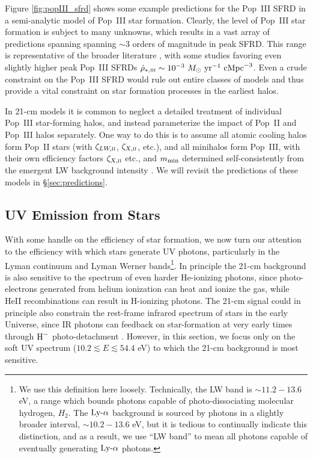 Figure \ref{fig:popIII_sfrd} shows some example predictions for the Pop~III SFRD in a semi-analytic model of Pop~III star formation. Clearly, the level of Pop~III star formation is subject to many unknowns, which results in a vast array of predictions spanning spanning $\sim 3$ orders of magnitude in peak SFRD. This range is representative of the broader literature \cite{Trenti2009,Maio2010,Crosby2013,Visbal2018,Mebane2018,Jaacks2018,Sarmento2018}, with some studies favoring even slightly higher peak Pop~III SFRDs $\dot{\rho}_{\ast,\textsc{iii}} \sim 10^{-3} \ \sfrdunits$. Even a crude constraint on the Pop~III SFRD would rule out entire classes of models and thus provide a vital constraint on star formation processes in the earliest halos.

In 21-cm models it is common to neglect a detailed treatment of individual Pop~III star-forming halos, and instead parameterize the impact of Pop~II and Pop~III halos separately. One way to do this is to assume all atomic cooling halos form Pop~II stars (with $\zeta_{LW,\textsc{ii}}$, $\zeta_{X,\textsc{ii}}$, etc.), and all minihalos form Pop~III, with their own efficiency factors $\zeta_{X,\textsc{ii}}$ etc., and $m_{\text{min}}$ determined self-consistently from the emergent LW background intensity \cite{Fialkov2014a,Mirocha2018}. We will revisit the predictions of these models in \S\ref{sec:predictions}.

\subsection{UV Emission from Stars} \label{sec:UV}
With some handle on the efficiency of star formation, we now turn our attention to the efficiency with which stars generate UV photons, particularly in the Lyman continuum and Lyman Werner bands\footnote{We use this definition here loosely. Technically, the LW band is $\sim 11.2-13.6$ eV, a range which bounds photons capable of photo-dissociating molecular hydrogen, $H_2$. The $\text{Ly-}\alpha$ background is sourced by photons in a slightly broader interval, $\sim 10.2-13.6$ eV, but it is tedious to continually indicate this distinction, and as a result, we use ``LW band'' to mean all photons capable of eventually generating $\text{Ly-}\alpha$ photons.}. In principle the 21-cm background is also sensitive to the spectrum of even harder He-ionizing photons, since photo-electrons generated from helium ionization can heat and ionize the gas, while HeII recombinations can result in H-ionizing photons. The 21-cm signal could in principle also constrain the rest-frame infrared spectrum of stars in the early Universe, since IR photons can feedback on star-formation at very early times through $\text{H}^{-}$ photo-detachment \cite{WolcottGreen2012}. However, in this section, we focus only on the soft UV spectrum ($10.2 \lesssim E \lesssim 54.4$ eV) to which the 21-cm background is most sensitive.

